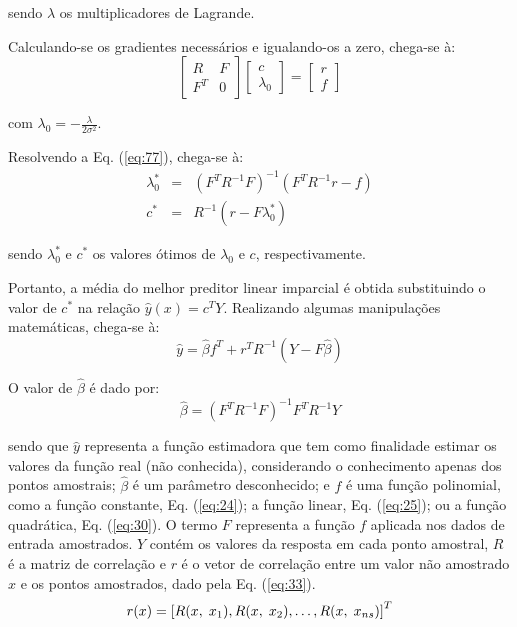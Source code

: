 \noindent sendo $\lambda$ os multiplicadores de Lagrande.

Calculando-se os gradientes necessários e igualando-os a zero, chega-se à:
\begin{equation}
\left[\begin{array}{cc}
R & F \\
{F}^T & 0 \end{array}\right]
\left[\begin{array}{c}
c \\
{\lambda}_0 \end{array}\right]=
\left[\begin{array}{c}
r \\
f \end{array}\right]
\label{eq:77}
\end{equation}

\noindent com ${\lambda}_0 = -\frac{\lambda}{2{\sigma}^2}$.

Resolvendo a Eq. (\ref{eq:77}), chega-se à:
\begin{eqnarray}
{\lambda}_0^* & = & \left({F}^T{R}^{-1}F\right)^{-1} \left({F}^T{R}^{-1}r-f\right)\nonumber\\
{c}^* & = &  {R}^{-1}\left(r-F{\lambda}_0^*\right)
\label{eq:321}
\end{eqnarray}

\noindent sendo $\lambda_0^*$ e $c^*$ os valores ótimos de $\lambda_0$ e $c$, respectivamente. 

Portanto, a média do melhor preditor linear imparcial é obtida substituindo o valor de $c^*$ na relação $\hat{y}(x) = {c}^TY$. Realizando algumas manipulações matemáticas, chega-se à:
\begin{equation}
\hat{y}=\hat{\beta}{f}^T+{r}^TR^{-1}(Y-F\hat{\beta})
\label{eq:31}
\end{equation}

O valor de $\hat\beta$ é dado por:
\begin{equation}
{\hat\beta}= ({F^T}R^{-1}F)^{-1}F^TR^{-1}Y
\label{eq:32}
\end{equation}

\noindent sendo que $\hat{y}$ representa a função estimadora que tem como finalidade estimar os valores da função real (não conhecida), considerando o conhecimento apenas dos pontos amostrais; $\hat{\beta}$  é um parâmetro desconhecido; e $f$ é uma função polinomial, como a função constante, Eq. (\ref{eq:24}); a função linear, Eq. (\ref{eq:25}); ou a função quadrática, Eq. (\ref{eq:30}). O termo $F$ representa a função $f$ aplicada nos dados de entrada amostrados. $Y$ contém os valores da resposta em cada ponto amostral, $R$ é a matriz de correlação e $r$ é o vetor de correlação entre um valor não amostrado $x$ e os pontos amostrados, dado pela Eq. (\ref{eq:33}).
\begin{equation}
r(x) = \left [ R(x,\hspace{0.1 cm}{x}_1), R(x,\hspace{0.1 cm}{x}_2),  \ldots, R(x,\hspace{0.1 cm}{x}_{ns}) \right ]^T
\label{eq:33}
\end{equation}

